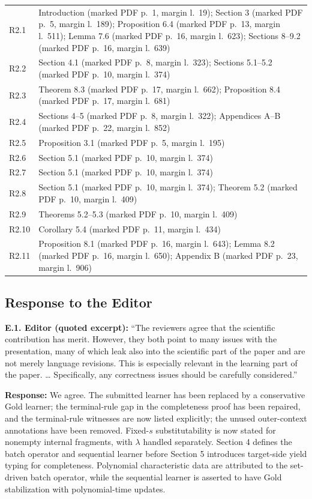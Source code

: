 \documentclass[
  10pt,
  a4paper,
]{article}
\begin{document}
\begin{longtable}{@{}p{}p{}@{}}
R2.1 & Introduction (marked PDF p.~1, margin l.~19); Section 3 (marked PDF p.~5, margin l.~189); Proposition 6.4 (marked PDF p.~13, margin l.~511); Lemma 7.6 (marked PDF p.~16, margin l.~623); Sections 8--9.2 (marked PDF p.~16, margin l.~639)\\
R2.2 & Section 4.1 (marked PDF p.~8, margin l.~323); Sections 5.1--5.2 (marked PDF p.~10, margin l.~374)\\
R2.3 & Theorem 8.3 (marked PDF p.~17, margin l.~662); Proposition 8.4 (marked PDF p.~17, margin l.~681)\\
R2.4 & Sections 4--5 (marked PDF p.~8, margin l.~322); Appendices A--B (marked PDF p.~22, margin l.~852)\\
R2.5 & Proposition 3.1 (marked PDF p.~5, margin l.~195)\\
R2.6 & Section 5.1 (marked PDF p.~10, margin l.~374)\\
R2.7 & Section 5.1 (marked PDF p.~10, margin l.~374)\\
R2.8 & Section 5.1 (marked PDF p.~10, margin l.~374); Theorem 5.2 (marked PDF p.~10, margin l.~409)\\
R2.9 & Theorems 5.2--5.3 (marked PDF p.~10, margin l.~409)\\
R2.10 & Corollary 5.4 (marked PDF p.~11, margin l.~434)\\
R2.11 & Proposition 8.1 (marked PDF p.~16, margin l.~643); Lemma 8.2 (marked PDF p.~16, margin l.~650); Appendix B (marked PDF p.~23, margin l.~906)\\
\bottomrule
\end{longtable}
\endgroup

\subsection{Response to the Editor}\label{response-to-the-editor}

\textbf{E.1. Editor (quoted excerpt):} ``The reviewers agree that the
scientific contribution has merit. However, they both point to many
issues with the presentation, many of which leak also into the
scientific part of the paper and are not merely language revisions. This
is especially relevant in the learning part of the paper. \ldots{}
Specifically, any correctness issues should be carefully considered.''

\textbf{Response:} We agree. The submitted learner has been replaced by
a conservative Gold learner; the terminal-rule gap in the completeness
proof has been repaired, and the terminal-rule witnesses are now listed
explicitly; the unused outer-context
annotations have been removed. Fixed-\(s\) substitutability is now stated for
nonempty internal fragments, with \(\lambda\) handled separately. Section 4
defines the batch operator and sequential learner before Section 5 introduces
target-side yield typing for completeness. Polynomial characteristic data are
attributed to the set-driven batch operator, while the sequential learner is
asserted to have Gold stabilization with polynomial-time updates.
\end{document}

